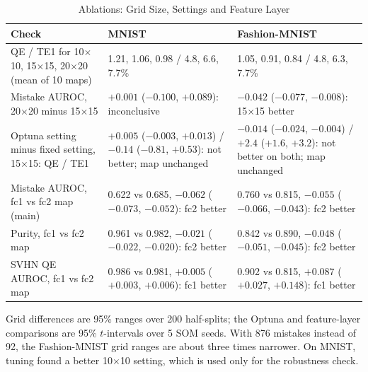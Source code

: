 \documentclass{scrartcl}
\begin{document}
\begin{table}[H]
\centering
\caption{Ablations: Grid Size, Settings and Feature Layer}
\label{tab:ablation}
\renewcommand{\arraystretch}{1.12}
\footnotesize
\begin{tabular}{|L{0.40\textwidth}|C{0.25\textwidth}|C{0.25\textwidth}|}
\hline
\textbf{Check} & \textbf{MNIST} & \textbf{Fashion-MNIST} \\ \hline
QE / TE1 for 10$\times$10, 15$\times$15, 20$\times$20 (mean of 10 maps) & 1.21, 1.06, 0.98 / 4.8, 6.6, 7.7\% & 1.05, 0.91, 0.84 / 4.8, 6.3, 7.7\% \\ \hline
Mistake AUROC, 20$\times$20 minus 15$\times$15 & $+0.001$ ($-0.100$, $+0.089$): inconclusive & $-0.042$ ($-0.077$, $-0.008$): 15$\times$15 better \\ \hline
Optuna setting minus fixed setting, 15$\times$15: QE / TE1 & $+0.005$ ($-0.003$, $+0.013$) / $-0.14$ ($-0.81$, $+0.53$): not better; map unchanged & $-0.014$ ($-0.024$, $-0.004$) / $+2.4$ ($+1.6$, $+3.2$): not better on both; map unchanged \\ \hline
Mistake AUROC, fc1 vs fc2 map (main) & 0.622 vs 0.685, $-0.062$ ($-0.073$, $-0.052$): fc2 better & 0.760 vs 0.815, $-0.055$ ($-0.066$, $-0.043$): fc2 better \\ \hline
Purity, fc1 vs fc2 map & 0.961 vs 0.982, $-0.021$ ($-0.022$, $-0.020$): fc2 better & 0.842 vs 0.890, $-0.048$ ($-0.051$, $-0.045$): fc2 better \\ \hline
SVHN QE AUROC, fc1 vs fc2 map & 0.986 vs 0.981, $+0.005$ ($+0.003$, $+0.006$): fc1 better & 0.902 vs 0.815, $+0.087$ ($+0.027$, $+0.148$): fc1 better \\ \hline
\end{tabular}

\par\vspace{3pt}
{\footnotesize\raggedright\noindent Grid differences are 95\% ranges over 200 half-splits; the Optuna and feature-layer comparisons are 95\% $t$-intervals over 5 SOM seeds. With 876 mistakes instead of 92, the Fashion-MNIST grid ranges are about three times narrower. On MNIST, tuning found a better 10$\times$10 setting, which is used only for the robustness check.\par}
\end{table}
\end{document}
